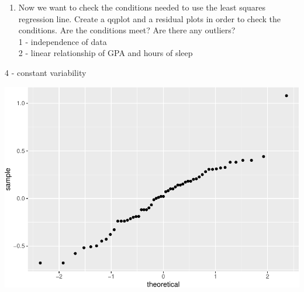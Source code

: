 \documentclass[]{article}
\newenvironment{Shaded}{\begin{snugshade}}{\end{snugshade}}
\newcommand{\DataTypeTok}[1]{\textcolor[rgb]{0.13,0.29,0.53}{#1}}
\newcommand{\KeywordTok}[1]{\textcolor[rgb]{0.13,0.29,0.53}{\textbf{#1}}}
\newcommand{\NormalTok}[1]{#1}
\newcommand{\OperatorTok}[1]{\textcolor[rgb]{0.81,0.36,0.00}{\textbf{#1}}}
\newcommand{\StringTok}[1]{\textcolor[rgb]{0.31,0.60,0.02}{#1}}
\providecommand{\tightlist}{%
  \setlength{\itemsep}{0pt}\setlength{\parskip}{0pt}}
\begin{document}
\begin{Shaded}
\end{Shaded}

\begin{enumerate}
\def\labelenumi{\arabic{enumi}.}
\setcounter{enumi}{6}
\tightlist
\item
  Now we want to check the conditions needed to use the least squares
  regression line. Create a qqplot and a residual plots in order to
  check the conditions. Are the conditions meet? Are there any
  outliers?\\
  1 - independence of data\\
  2 - linear relationship of GPA and hours of sleep
\end{enumerate}

4 - constant variability

\begin{Shaded}
\end{Shaded}

\includegraphics{lab-8-regression_files/figure-latex/unnamed-chunk-7-1.pdf}
\end{document}
